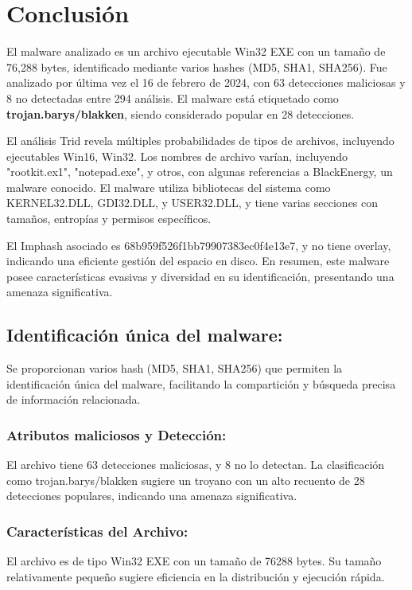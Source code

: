 \section{Conclusión}

El malware analizado es un archivo ejecutable Win32 EXE con un tamaño de 76,288 bytes, identificado mediante varios hashes (MD5, SHA1, SHA256). Fue analizado por última vez el 16 de febrero de 2024, con 63 detecciones maliciosas y 8 no detectadas entre 294 análisis. El malware está etiquetado como \textbf{trojan.barys/blakken}, siendo considerado popular en 28 detecciones.

El análisis Trid revela múltiples probabilidades de tipos de archivos, incluyendo ejecutables Win16, Win32. Los nombres de archivo varían, incluyendo "rootkit.ex1", "notepad.exe", y otros, con algunas referencias a BlackEnergy, un malware conocido. El malware utiliza bibliotecas del sistema como KERNEL32.DLL, GDI32.DLL, y USER32.DLL, y tiene varias secciones con tamaños, entropías y permisos específicos.

El Imphash asociado es 68b959f526f1bb79907383ec0f4e13e7, y no tiene overlay, indicando una eficiente gestión del espacio en disco. En resumen, este malware posee características evasivas y diversidad en su identificación, presentando una amenaza significativa.
\subsection{Identificación única del malware:}
Se proporcionan varios hash (MD5, SHA1, SHA256) que permiten la identificación única del malware, facilitando la compartición y búsqueda precisa de información relacionada.
\subsubsection{Atributos maliciosos y Detección:}

El archivo tiene 63 detecciones maliciosas, y 8 no lo detectan. La clasificación como trojan.barys/blakken sugiere un troyano con un alto recuento de 28 detecciones populares, indicando una amenaza significativa.
\subsubsection{Características del Archivo:}
El archivo es de tipo Win32 EXE con un tamaño de 76288 bytes. Su tamaño relativamente pequeño sugiere eficiencia en la distribución y ejecución rápida.
